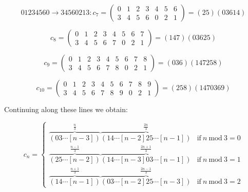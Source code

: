 \documentclass[a4paper,10pt]{article}
\theoremstyle{definition}
\begin{document}
\begin{equation}
01234560\rightarrow34560213:c_7=
\begin{pmatrix}
0&1&2&3&4&5&6\\
3&4&5&6&0&2&1
\end{pmatrix} = (25)(03614)
\end{equation}

\begin{equation}c_8=
\begin{pmatrix}
0&1&2&3&4&5&6&7\\
3&4&5&6&7&0&2&1
\end{pmatrix} = (147)(03625)
\end{equation}

\begin{equation}
c_9=
\begin{pmatrix}
0&1&2&3&4&5&6&7&8\\
3&4&5&6&7&8&0&2&1
\end{pmatrix} = (036)(147258)
\end{equation}

\begin{equation}
c_10=
\begin{pmatrix}
0&1&2&3&4&5&6&7&8&9\\
3&4&5&6&7&8&9&0&2&1
\end{pmatrix} = (258)(1470369)
\end{equation}

Continuing along these lines we obtain:

\begin{equation}
c_n = \left\{
\begin{array}{ll}
\overbrace{(03\cdots[n-3])}^{\frac{n}{3}}\overbrace{(14\cdots[n-2]25\cdots[n-1])}^{\frac{2n}{3}}&\textrm{if}~n~\textrm{mod}~3=0\\
\overbrace{(25\cdots[n-2])}^{\frac{n-1}{3}}\overbrace{(14\cdots[n-3]03\cdots[n-1])}^{\frac{2n+1}{3}} &\textrm{if}~n~\textrm{mod}~3=1\\
\overbrace{(14\cdots[n-1])}^{\frac{n+1}{3}}\overbrace{(03\cdots[n-2]25\cdots[n-3])}^{\frac{2n-1}{3}} &\textrm{if}~n~\textrm{mod}~3=2 
\end{array}
\right.
\end{equation}

% 
% 
% 
\end{document}
